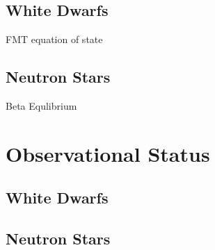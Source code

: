 \subsection{White Dwarfs}

FMT equation of state

\subsection{Neutron Stars}


Beta Equlibrium
\section{Observational Status}

\subsection{White Dwarfs}

\subsection{Neutron Stars}

